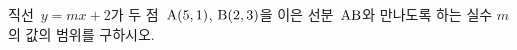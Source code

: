 직선~$y=mx+2$가 두 점~$\mathrm{A}(5{,}\mkern3mu\mathopen{}1)$, $\mathrm{B}(2{,}\mkern3mu\mathopen{}3)$을 이은 선분~$\mathrm{AB}$와 만나도록 하는 실수 $m$의 값의 범위를 구하시오.
